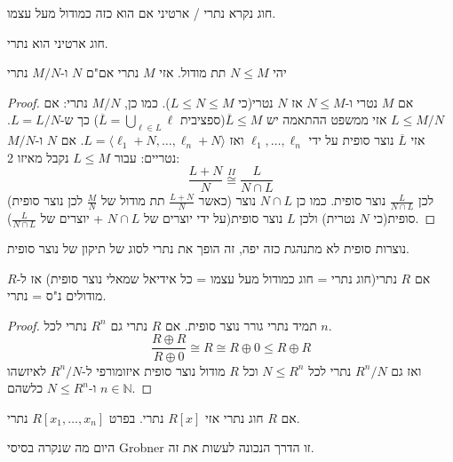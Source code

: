 \documentclass{tstextbook}
\begin{document}
\begin{definition}
חוג נקרא נתרי / ארטיני אם הוא כזה כמודול מעל עצמו.

\end{definition}
\begin{theorem}
חוג ארטיני הוא נתרי.

\end{theorem}
\begin{proposition}
יהי \(N\leq M\) תת מודול. אזי \(M\) נתרי אם"ם \(N\) ו-\(M / N\) נתרי

\end{proposition}
\begin{proof}
אם \(M\) נטרי ו-\(N\leq M\) אז \(N\) נטרי(כי \(L\leq N \leq M\)). כמו כן, \(M / N\) נתרי:
אם \(L\leq M / N\) אזי ממשפט ההתאמה יש \(\overline{L}\leq M\)(ספציבית \(\overline{L}=\bigcup_{\ell \in L}\ell\)) כך ש-\(L = L / N\). אזי \(\overline{L}\) נוצר סופית על ידי \(\ell_{1},\dots,\ell_{n}\) ואז \(L=\langle \ell_{1}+N, \dots,\ell_{n}+N \rangle\).
אם \(N\) ו-\(M / N\) נטריים:
עבור \(L\leq M\) נקבל מאיזו 2:
$$\frac{L+N}{N}\overset{II}{\cong } \frac{L}{N\cap  L}$$
(כאשר \(\frac{L+N}{N}\) תת מודול של \(\frac{M}{ N}\) לכן נוצר סופית) לכן \(\frac{L}{N \cap L}\) נוצר סופית. כמו כן \(N\cap L\) נוצר סופית(כי \(N\) נטרית) ולכן \(L\) נוצר סופית(על ידי יוצרים של \(N\cap L\) + יוצרים של \(\frac{L}{N\cap L}\)).

\end{proof}
\begin{remark}
נוצרות סופית לא מתנהגת כזה יפה, זה הופך את נתרי לסוג של תיקון של נוצר סופית.

\end{remark}
\begin{corollary}
אם \(R\) נתרי(חוג נתרי = חוג כמודול מעל עצמו = כל אידיאל שמאלי נוצר סופית) אז ל-\(R\) מודולים נ"ס = נתרי.

\end{corollary}
\begin{proof}
תמיד נתרי גורר נוצר סופית. אם \(R\) נתרי גם \(R^{n}\) נתרי לכל \(n\).
$$\frac{R\oplus R}{R\oplus 0}\cong R\cong R\oplus 0 \leq  R\oplus R$$
ואז גם \(R^{n} / N\) נתרי לכל \(N\leq R^{n}\) וכל \(R\) מודול נוצר סופית איזומורפי ל-\(R^{n} / N\) לאיזשהו \(n \in \mathbb{N}\) ו-\(N\leq R^{n}\) כלשהם.

\end{proof}
\begin{proposition}
אם \(R\) חוג נתרי אזי \(R[x]\) נתרי. בפרט \(R[x_{1},\dots,x_{n}]\) נתרי.

\end{proposition}
\begin{remark}
היום מה שנקרה בסיסי Grobner זו הדרך הנכונה לעשות את זה.

\end{remark}
\end{document}
